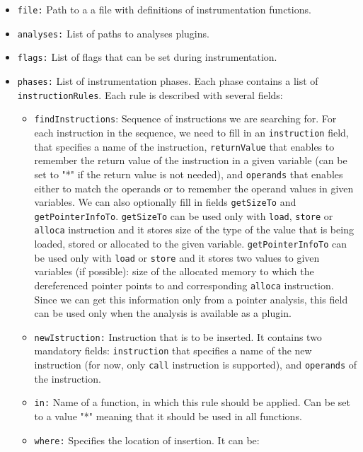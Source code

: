 \medskip
\begin{itemize}
\item \texttt{file:} Path to a a file with definitions of instrumentation functions.
\item \texttt{analyses:} List of paths to analyses plugins.
\item \texttt{flags:} List of flags that can be set during instrumentation.
\item \texttt{phases:} List of instrumentation phases. Each phase contains a
  list of \texttt{instructionRules}. Each rule is described with several fields:
  \begin{itemize}
    \item \texttt{findInstructions}: Sequence of instructions we are searching
    for. For each instruction in the sequence, we need to fill in an
        \texttt{instruction} field, that specifies a name of the instruction,
        \texttt{returnValue} that enables to remember the return value of the
        instruction in a given variable (can be set to "*" if the return value
        is not needed), and \texttt{operands} that enables either to match the
        operands or to remember the operand values in given variables. We can
        also optionally fill in fields \texttt{getSizeTo} and
        \texttt{getPointerInfoTo}. \texttt{getSizeTo} can be used only with
        \texttt{load}, \texttt{store} or \texttt{alloca} instruction and it
        stores size of the type of the value that is being loaded, stored or
        allocated to the given variable. \texttt{getPointerInfoTo} can be used
        only with \texttt{load} or \texttt{store} and it stores two values to
        given variables (if possible): size of the allocated memory to which
        the dereferenced pointer points to and corresponding \texttt{alloca}
        instruction. Since we can get this information only from a pointer
        analysis, this field can be used only when the analysis is available as
        a plugin.
    \item \texttt{newIstruction:} Instruction that is to be inserted. It
    contains two mandatory fields: \texttt{instruction} that specifies a name
    of the new instruction (for now, only \texttt{call} instruction is
    supported), and \texttt{operands} of the instruction.
    \item \texttt{in:} Name of a function, in which this rule should be
    applied. Can be set to a value "*" meaning that it should be used in all
    functions.
    \item \texttt{where:} Specifies the location of insertion. It can be:

\end{itemize}
\end{itemize}
